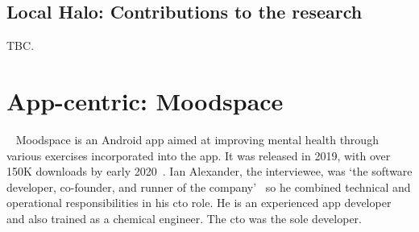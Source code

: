 \subsection{Local Halo: Contributions to the research}
TBC.



\section{App-centric: Moodspace}~\label{case-study-overview-moodspace} %
Moodspace is an Android app aimed at improving mental health through various exercises incorporated into the app. %
It was released in 2019, with over 150K downloads by early 2020~. Ian Alexander, the interviewee, was `the software developer, co-founder, and runner of the company'~ so he combined technical and operational responsibilities in his \Gls{cto} role. He is an experienced app developer and also trained as a chemical engineer. The \Gls{cto} was the sole developer. 

